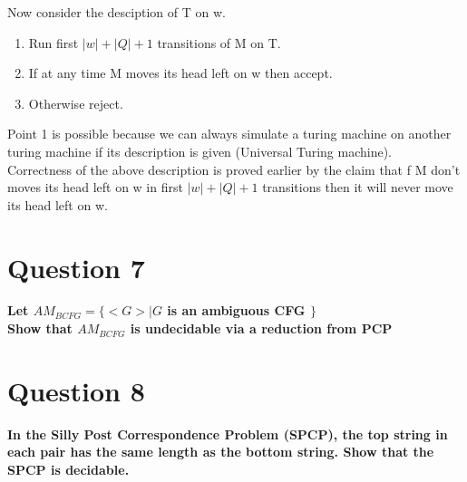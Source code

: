 \documentclass{article}
\begin{document}
Now consider the desciption of T on w.\\
\begin{enumerate}
    \item Run first $|w| + |Q| + 1$ transitions of M on T.
    \item If at any time M moves its head left on w then accept.
    \item Otherwise reject.
\end{enumerate}


Point 1 is possible because we can always simulate a turing machine on another turing machine if its description is given (Universal Turing machine).\\
Correctness of the above description is proved earlier by the claim that f M don't moves its head left on w in first $|w| + |Q| + 1$ transitions then it will never move its head left on w.\\
\pagebreak


\section{Question 7}

\textbf{Let $AM_{BCFG} = \{< G > | G$ is an ambiguous CFG $\}$ \\
    Show that $AM_{BCFG}$ is undecidable via a reduction from PCP\\}

\pagebreak


\section{Question 8}
\textbf{In the Silly Post Correspondence Problem (SPCP), the top string in each pair has the same
length as the bottom string. Show that the SPCP is decidable.\\}

\pagebreak
\end{document}
